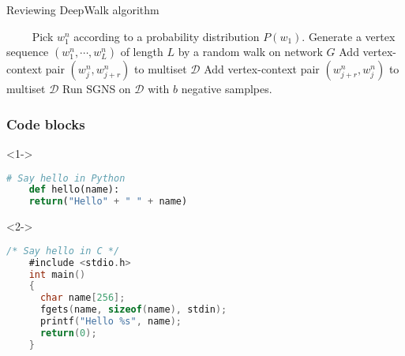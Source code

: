 \documentclass[UTF8, aspectratio=169 , 10pt，punct=kaiming]{beamer} %
\begin{document}
\begin{frame}{Reviewing DeepWalk algorithm}
  \begin{algorithm}[H]
    \caption{Reviewing random walk + skip gram}%
    \LinesNumbered %
     {
      　　 Pick $w_{1}^{n}$ according to a probability distribution $P\left(w_{1}\right)$.
          Generate a vertex sequence $\left(w_{1}^{n}, \cdots, w_{L}^{n}\right)$ of length $L$ by a random walk on network $G$ \;
           {
             {
              Add vertex-context pair $\left(w_{j}^{n}, w_{j+r}^{n}\right)$ to multiset $\mathcal{D}$ \;
              Add vertex-context pair $\left(w_{j+r}^{n}, w_{j}^{n}\right)$ to multiset $\mathcal{D}$
            }
          }
    }
    Run SGNS on $ \mathcal{D}$ with $b$  negative samplpes.
  \end{algorithm}
\end{frame}

\begin{frame}[fragile]
  \frametitle{Code blocks}

\begin{uncoverenv}<1->
  \begin{lstlisting}[language=Python]
    # Say hello in Python
    def hello(name):
    return("Hello" + " " + name)
  \end{lstlisting}
\end{uncoverenv}
    
\begin{uncoverenv}<2->
  \begin{lstlisting}[language=C]
    /* Say hello in C */
    #include <stdio.h>
    int main()
    {
      char name[256];
      fgets(name, sizeof(name), stdin);
      printf("Hello %s", name);
      return(0);
    }
  \end{lstlisting}
  \end{uncoverenv}
\end{frame}
\end{document}
